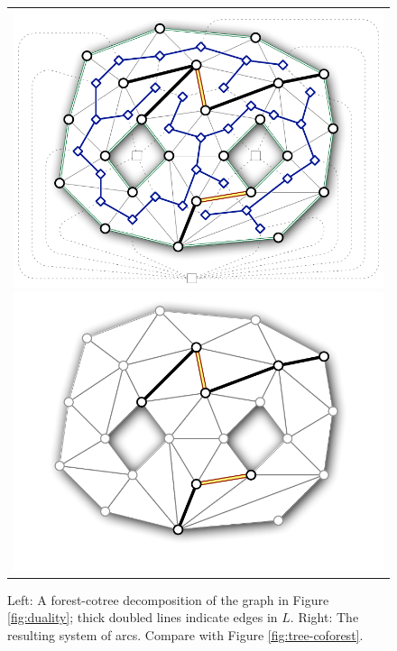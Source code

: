 \documentclass[letterpaper,review]{siamart190516}
\begin{document}
\begin{figure}[htb]
\centering\footnotesize\sf
\begin{tabular}{c}
\includegraphics[scale=0.45]{Fig/forest-cotree2} \qquad
\includegraphics[scale=0.45]{Fig/forest-cotree-arcs2}
\end{tabular}
\caption{Left: A forest-cotree decomposition of the graph in Figure \ref{fig:duality}; thick doubled lines indicate edges in $L$.
Right: The resulting system of arcs.  Compare with Figure \ref{fig:tree-coforest}.}
\label{fig:forest-cotree}
\end{figure}
\end{document}
